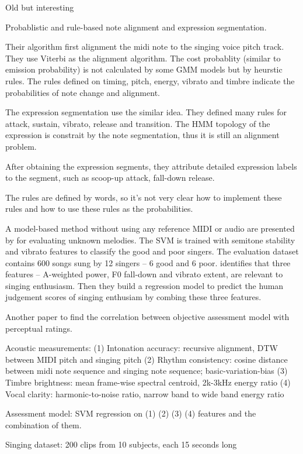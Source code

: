  Old but interesting

Probablistic and rule-based note alignment and expression segmentation.

Their algorithm first alignment the midi note to the singing voice pitch track. They use Viterbi as the alignment algorithm. The cost probablity (similar to emission probability) is not calculated by some GMM models but by heurstic rules. The rules defined on timing, pitch, energy, vibrato and timbre indicate the probabilities of note change and alignment.

The expression segmentation use the similar idea. They defined many rules for attack, sustain, vibrato, release and transition. The HMM topology of the expression is constrait by the note segmentation, thus it is still an alignment problem.

After obtaining the expression segments, they attribute detailed expression labels to the segment, such as scoop-up attack, fall-down release.

The rules are defined by words, so it's not very clear how to implement these rules and how to use these rules as the probabilities.

A model-based method without using any reference MIDI or audio are presented by  for evaluating unknown melodies. The SVM is trained with semitone stability and vibrato features to classify the good and poor singers. The evaluation dataset contains 600 songs sung by 12 singers -- 6 good and 6 poor.  identifies that three features -- A-weighted power, F0 fall-down and vibrato extent, are relevant to singing enthusiasm. Then they build a regression model to predict the human judgement scores of singing enthusiam by combing these three features.

 Another paper to find the correlation between objective assessment model with perceptual ratings.

Acoustic measurements:
(1) Intonation accuracy: recursive alignment, DTW between MIDI pitch and singing pitch
(2) Rhythm consistency: cosine distance between midi note sequence and singing note sequence; basic-variation-bias
(3) Timbre brightness: mean frame-wise spectral centroid, 2k-3kHz energy ratio
(4) Vocal clarity: harmonic-to-noise ratio, narrow band to wide band energy ratio

Assessment model:
SVM regression on (1) (2) (3) (4) features and the combination of them.

Singing dataset:
200 clips from 10 subjects, each 15 seconds long

